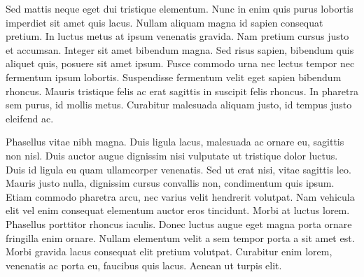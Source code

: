 Sed mattis neque eget dui tristique elementum. Nunc in enim quis purus lobortis imperdiet sit amet quis lacus. Nullam aliquam magna id sapien consequat pretium. In luctus metus at ipsum venenatis gravida. Nam pretium cursus justo et accumsan. Integer sit amet bibendum magna. Sed risus sapien, bibendum quis aliquet quis, posuere sit amet ipsum. Fusce commodo urna nec lectus tempor nec fermentum ipsum lobortis. Suspendisse fermentum velit eget sapien bibendum rhoncus. Mauris tristique felis ac erat sagittis in suscipit felis rhoncus. In pharetra sem purus, id mollis metus. Curabitur malesuada aliquam justo, id tempus justo eleifend ac.

Phasellus vitae nibh magna. Duis ligula lacus, malesuada ac ornare eu, sagittis non nisl. Duis auctor augue dignissim nisi vulputate ut tristique dolor luctus. Duis id ligula eu quam ullamcorper venenatis. Sed ut erat nisi, vitae sagittis leo. Mauris justo nulla, dignissim cursus convallis non, condimentum quis ipsum. Etiam commodo pharetra arcu, nec varius velit hendrerit volutpat. Nam vehicula elit vel enim consequat elementum auctor eros tincidunt. Morbi at luctus lorem. Phasellus porttitor rhoncus iaculis. Donec luctus augue eget magna porta ornare fringilla enim ornare. Nullam elementum velit a sem tempor porta a sit amet est. Morbi gravida lacus consequat elit pretium volutpat. Curabitur enim lorem, venenatis ac porta eu, faucibus quis lacus. Aenean ut turpis elit.
